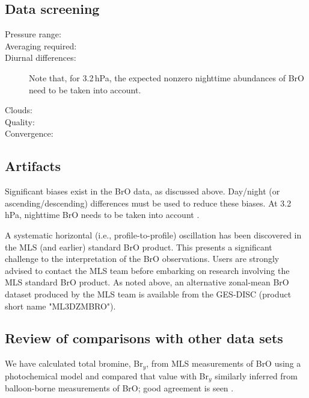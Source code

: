 \begin{nofloatpages}
\subsection{Data screening}
\label{sec:BrOScreening}
\begin{description}
  \item[Pressure range:]  \standardrangestatement
  \item[Averaging required:] 
  \item[Diurnal differences:]  Note that, for 3.2\,hPa, the expected nonzero nighttime abundances of BrO need to be taken into account. \standardprecisionrule \evenstatusrule
  \item[Clouds:] \cloudsokrule
  \item[Quality:] 
  \item[Convergence:] 
\end{description}
\end{nofloatpages}

\subsection{Artifacts}
Significant biases exist in the BrO data, as discussed above. Day/night (or ascending/descending) differences must be used to reduce these biases. At 3.2\,hPa, nighttime BrO needs to be taken into account \citep{KovalenkoEtal:2007:BrO}.

A systematic horizontal (i.e., profile-to-profile) oscillation has been discovered in the MLS \thisv (and earlier) standard BrO product. This presents a significant challenge to the interpretation of the BrO observations. Users are strongly advised to contact the MLS team before embarking on research involving the MLS standard BrO product. As noted above, an alternative zonal-mean BrO dataset produced by the MLS team is available from the GES-DISC (product short name "ML3DZMBRO").

\subsection{Review of comparisons with other data sets}
We have calculated total bromine, Br$_{y}$, from MLS measurements of BrO using a photochemical model and compared that value with Br$_{y}$ similarly inferred from balloon-borne measurements of BrO; good agreement is seen \citep{KovalenkoEtal:2007:BrO, MillanEtal:2012}.


